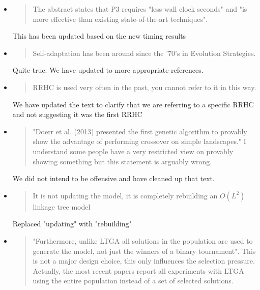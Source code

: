 \documentclass[]{article}
\begin{document}
\begin{itemize}
\item
\begin{quote}
The abstract states that P3 requires "less wall clock seconds" and "is more effective than existing state-of-the-art techniques".
\end{quote}

This has been updated based on the new timing results

\item
\begin{quote}
 Self-adaptation has been around since the '70's in Evolution Strategies.
\end{quote}

Quite true. We have updated to more appropriate references.

\item
\begin{quote}
RRHC is used very often in the past, you cannot refer to it in this way.
\end{quote}

We have updated the text to clarify that we are referring to a specific RRHC and not suggesting it was the first RRHC

\item
\begin{quote}
"Doerr et al. (2013) presented the first genetic algorithm to provably show the advantage of performing crossover on simple landscapes."
I understand some people have a very restricted view on provably showing something but this statement is arguably wrong.
\end{quote}

We did not intend to be offensive and have cleaned up that text.

\item
\begin{quote}
It is not updating the model, it is completely rebuilding an $O(L^2)$ linkage tree model 
\end{quote}

Replaced "updating" with "rebuilding"

\item
\begin{quote}
"Furthermore, unlike LTGA all solutions in the population are used to generate the model, not just the winners of a binary tournament".
This is not a major design choice, this only influences the selection pressure. Actually, the most recent papers report all experiments with LTGA using the entire population instead of a set of selected solutions.
\end{quote}


\end{itemize}
\end{document}
